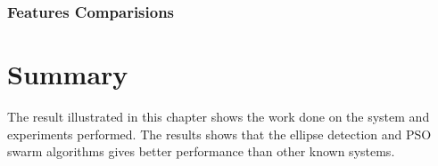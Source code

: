 
\subsubsection{Features Comparisions}
\label{sec:featuresComparisions}


\section{Summary}
\label{sec:ResultSummary}

The result illustrated in this chapter shows the work done on the system and experiments performed. The results shows that the ellipse detection and PSO swarm algorithms gives better performance than other known systems. 


